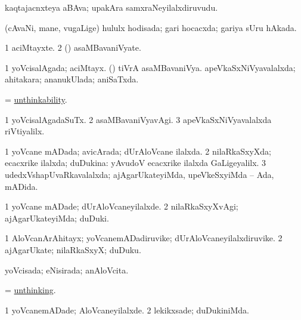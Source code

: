 \bentry
{} 
\gl{\nA}
\expl{}
\bmng
kaqtajacnxteya aBAva; upakAra samxraNeyilalxdiruvudu. 
\emng
\eentry

\bentry
{} 
\gl{\gu}
\expl{}
\bmng
(cAvaNi, mane, \mo vugaLige) hululx hodisada; gari hocacxda; gariya sUru hAkada. 
\emng
\eentry

\bentry
{} 
\gl{\nA}
\expl{}
\bmng
\bnum
\num{1} aciMtayxte. 
\num{2} (\AmA) asaMBavaniVyate. 
\enum
\emng
\eentry

\bentry
{} 
\gl{\gu}
\expl{}
\bmng
\bnum
\num{1} yoVcisalAgada; aciMtayx. 
 (\AmA) 
\banum
{} tiVrA asaMBavaniVya. 
 apeVkaSxNiVyavalalxda; ahitakara; ananukUlada; aniSaTxda. 
\eanum
\numie
\enum
\emng
\eentry

\bentry
{} 
\gl{\nA}
\expl{}
\bmng
= \hyperlink{unthinkability}{unthinkability}. 
\emng
\eentry

\bentry
{} 
\gl{\kirxvi}
\expl{}
\bmng
\bnum
\num{1} yoVcisalAgadaSuTx. 
\num{2} asaMBavaniVyavAgi. 
\num{3} apeVkaSxNiVyavalalxda riVtiyalilx. 
\enum
\emng
\eentry

\bentry
{} 
\gl{\gu}
\expl{}
\bmng
\bnum
\num{1} yoVcane mADada; avicArada; dUrAloVcane ilalxda. 
\num{2} nilaRkaSxyXda; ecacxrike ilalxda; duDukina:  yAvudoV ecacxrike ilalxda GaLigeyalilx. 
\num{3} udedxVshapUvaRkavalalxda; ajAgarUkateyiMda, upeVkeSxyiMda -- Ada, mADida. 
\enum
\emng
\eentry

\bentry
{} 
\gl{\kirxvi}
\expl{}
\bmng
\bnum
\num{1} yoVcane mADade; dUrAloVcaneyilalxde. 
\num{2} nilaRkaSxyXvAgi; ajAgarUkateyiMda; duDuki. 
\enum
\emng
\eentry

\bentry
{} 
\gl{\nA}
\expl{}
\bmng
\bnum
\num{1} AloVcanArAhitayx; yoVcanemADadiruvike; dUrAloVcaneyilalxdiruvike. 
\num{2} ajAgarUkate; nilaRkaSxyX; duDuku. 
\enum
\emng
\eentry

\bentry
{} 
\gl{\gu}
\expl{}
\bmng
yoVcisada; eNisirada; anAloVcita. 
\emng
\eentry

\bentry
{} 
\gl{\gu}
\expl{}
\bmng
= \hyperlink{unthinking}{unthinking}. 
\emng
\eentry

\bentry
{} 
\gl{\kirxvi}
\expl{}
\bmng
\bnum
\num{1} yoVcanemADade; AloVcaneyilalxde. 
\num{2} lekikxsade; duDukiniMda. 
\enum
\emng
\eentry

